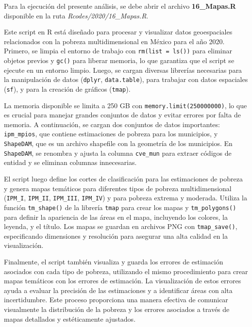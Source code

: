 \documentclass[
  12pt,
]{book}
\begin{document}
Para la ejecución del presente análisis, se debe abrir el archivo \textbf{16\_Mapas.R} disponible en la ruta \emph{Rcodes/2020/16\_Mapas.R}.

Este script en R está diseñado para procesar y visualizar datos geoespaciales relacionados con la pobreza multidimensional en México para el año 2020. Primero, se limpia el entorno de trabajo con \texttt{rm(list\ =\ ls())} para eliminar objetos previos y \texttt{gc()} para liberar memoria, lo que garantiza que el script se ejecute en un entorno limpio. Luego, se cargan diversas librerías necesarias para la manipulación de datos (\texttt{dplyr}, \texttt{data.table}), para trabajar con datos espaciales (\texttt{sf}), y para la creación de gráficos (\texttt{tmap}).

La memoria disponible se limita a 250 GB con \texttt{memory.limit(250000000)}, lo que es crucial para manejar grandes conjuntos de datos y evitar errores por falta de memoria. A continuación, se cargan dos conjuntos de datos importantes: \texttt{ipm\_mpios}, que contiene estimaciones de pobreza para los municipios, y \texttt{ShapeDAM}, que es un archivo shapefile con la geometría de los municipios. En \texttt{ShapeDAM}, se renombra y ajusta la columna \texttt{cve\_mun} para extraer códigos de entidad y se eliminan columnas innecesarias.

El script luego define los cortes de clasificación para las estimaciones de pobreza y genera mapas temáticos para diferentes tipos de pobreza multidimensional (\texttt{IPM\_I}, \texttt{IPM\_II}, \texttt{IPM\_III}, \texttt{IPM\_IV}) y para pobreza extrema y moderada. Utiliza la función \texttt{tm\_shape()} de la librería \texttt{tmap} para crear los mapas y \texttt{tm\_polygons()} para definir la apariencia de las áreas en el mapa, incluyendo los colores, la leyenda, y el título. Los mapas se guardan en archivos PNG con \texttt{tmap\_save()}, especificando dimensiones y resolución para asegurar una alta calidad en la visualización.

Finalmente, el script también visualiza y guarda los errores de estimación asociados con cada tipo de pobreza, utilizando el mismo procedimiento para crear mapas temáticos con los errores de estimación. La visualización de estos errores ayuda a evaluar la precisión de las estimaciones y a identificar áreas con alta incertidumbre. Este proceso proporciona una manera efectiva de comunicar visualmente la distribución de la pobreza y los errores asociados a través de mapas detallados y estéticamente ajustados.
\end{document}

